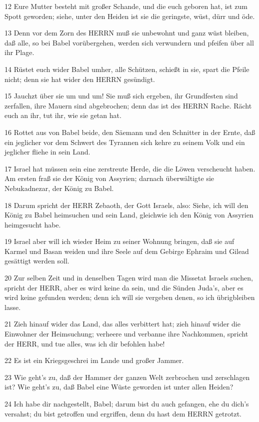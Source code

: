 \par 12 Eure Mutter besteht mit großer Schande, und die euch geboren hat, ist zum Spott geworden; siehe, unter den Heiden ist sie die geringste, wüst, dürr und öde.
\par 13 Denn vor dem Zorn des HERRN muß sie unbewohnt und ganz wüst bleiben, daß alle, so bei Babel vorübergehen, werden sich verwundern und pfeifen über all ihr Plage.
\par 14 Rüstet euch wider Babel umher, alle Schützen, schießt in sie, spart die Pfeile nicht; denn sie hat wider den HERRN gesündigt.
\par 15 Jauchzt über sie um und um! Sie muß sich ergeben, ihr Grundfesten sind zerfallen, ihre Mauern sind abgebrochen; denn das ist des HERRN Rache. Rächt euch an ihr, tut ihr, wie sie getan hat.
\par 16 Rottet aus von Babel beide, den Säemann und den Schnitter in der Ernte, daß ein jeglicher vor dem Schwert des Tyrannen sich kehre zu seinem Volk und ein jeglicher fliehe in sein Land.
\par 17 Israel hat müssen sein eine zerstreute Herde, die die Löwen verscheucht haben. Am ersten fraß sie der König von Assyrien; darnach überwältigte sie Nebukadnezar, der König zu Babel.
\par 18 Darum spricht der HERR Zebaoth, der Gott Israels, also: Siehe, ich will den König zu Babel heimsuchen und sein Land, gleichwie ich den König von Assyrien heimgesucht habe.
\par 19 Israel aber will ich wieder Heim zu seiner Wohnung bringen, daß sie auf Karmel und Basan weiden und ihre Seele auf dem Gebirge Ephraim und Gilead gesättigt werden soll.
\par 20 Zur selben Zeit und in denselben Tagen wird man die Missetat Israels suchen, spricht der HERR, aber es wird keine da sein, und die Sünden Juda's, aber es wird keine gefunden werden; denn ich will sie vergeben denen, so ich übrigbleiben lasse.
\par 21 Zieh hinauf wider das Land, das alles verbittert hat; zieh hinauf wider die Einwohner der Heimsuchung; verheere und verbanne ihre Nachkommen, spricht der HERR, und tue alles, was ich dir befohlen habe!
\par 22 Es ist ein Kriegsgeschrei im Lande und großer Jammer.
\par 23 Wie geht's zu, daß der Hammer der ganzen Welt zerbrochen und zerschlagen ist? Wie geht's zu, daß Babel eine Wüste geworden ist unter allen Heiden?
\par 24 Ich habe dir nachgestellt, Babel; darum bist du auch gefangen, ehe du dich's versahst; du bist getroffen und ergriffen, denn du hast dem HERRN getrotzt.
